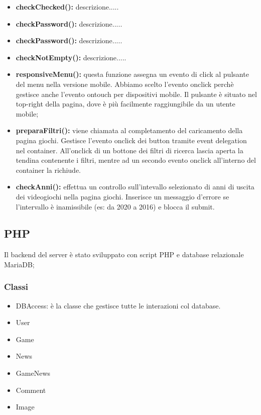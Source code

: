 \begin{itemize}
	\item \textbf{checkChecked(): } descrizione.....\\
	\item \textbf{checkPassword(): } descrizione.....\\
	\item \textbf{checkPassword(): } descrizione.....\\
	\item \textbf{checkNotEmpty(): } descrizione.....\\
	\item \textbf{responsiveMenu(): } questa funzione assegna un evento di click al pulsante del menu nella versione mobile.
	Abbiamo scelto l'evento onclick perchè gestisce anche l'evento ontouch per dispositivi mobile.
	Il pulsante è situato nel top-right della pagina, dove è più facilmente raggiungibile da un utente mobile;\\
	\item \textbf{preparaFiltri(): } viene chiamata al completamento del caricamento della pagina giochi. Gestisce l'evento onclick dei button tramite event delegation nel container. All'onclick di un bottone dei filtri di ricerca lascia aperta la tendina contenente i filtri, mentre ad un secondo evento onclick all'interno del container la richiude.\\
	\item \textbf{checkAnni(): } effettua un controllo sull'intevallo selezionato di anni di uscita dei videogiochi nella pagina giochi.
	Inserisce un messaggio d'errore se l'intervallo è inamissibile (es: da 2020 a 2016) e blocca il submit.\\
\end{itemize}

\subsection{PHP}
Il backend del server è stato sviluppato con script PHP e database relazionale MariaDB;

\subsubsection{Classi}
\begin{itemize}
	\item DBAccess: è la classe che gestisce tutte le interazioni col database.
	\item User
	\item Game
	\item News
	\item GameNews
	\item Comment
	\item Image
\end{itemize}

